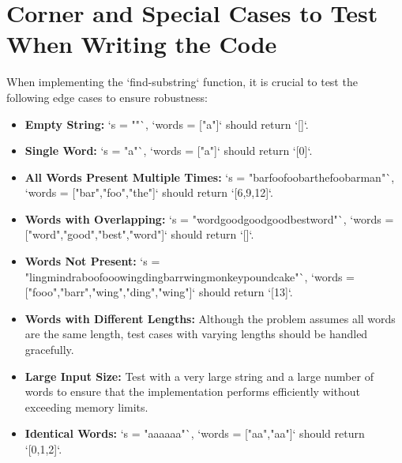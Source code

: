 \section*{Corner and Special Cases to Test When Writing the Code}

When implementing the `find-substring` function, it is crucial to test the following edge cases to ensure robustness:

\begin{itemize}
    \item \textbf{Empty String:} `s = ""`, `words = ["a"]` should return `[]`.
    
    \item \textbf{Single Word:} `s = "a"`, `words = ["a"]` should return `[0]`.
    
    \item \textbf{All Words Present Multiple Times:} `s = "barfoofoobarthefoobarman"`, `words = ["bar","foo","the"]` should return `[6,9,12]`.
    
    \item \textbf{Words with Overlapping:} `s = "wordgoodgoodgoodbestword"`, `words = ["word","good","best","word"]` should return `[]`.
    
    \item \textbf{Words Not Present:} `s = "lingmindraboofooowingdingbarrwingmonkeypoundcake"`, `words = ["fooo","barr","wing","ding","wing"]` should return `[13]`.
    
    \item \textbf{Words with Different Lengths:} Although the problem assumes all words are the same length, test cases with varying lengths should be handled gracefully.
    
    \item \textbf{Large Input Size:} Test with a very large string and a large number of words to ensure that the implementation performs efficiently without exceeding memory limits.
    
    \item \textbf{Identical Words:} `s = "aaaaaa"`, `words = ["aa","aa"]` should return `[0,1,2]`.
\end{itemize}

\printindex